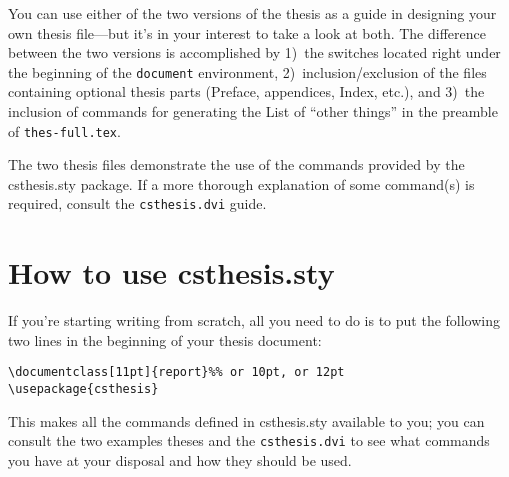 You can use either of the two versions of the thesis as a guide in
designing your own thesis file---but it's in your interest to take a
look at both. The difference between the two versions is accomplished
by 1)~the switches located right under the beginning of the
\verb+document+ environment, 2)~inclusion/exclusion of the files
containing optional thesis parts (Preface,
appendices, Index, etc.), and 3)~the inclusion of commands for
generating the List of ``other things'' in the preamble of
\texttt{thes-full.tex}.

The two thesis files demonstrate the use of the commands provided by
the \textsf{csthesis.sty}
package. If a more thorough explanation of some command(s) is
required, consult the
\texttt{csthesis.dvi} guide.

\section{How to use \textsf{csthesis.sty}}

If you're starting writing from scratch, all you
need to do is to put the following two lines in the beginning of your
thesis document:
\begin{verbatim}
\documentclass[11pt]{report}%% or 10pt, or 12pt
\usepackage{csthesis}
\end{verbatim}
This makes all the commands defined in \textsf{csthesis.sty}%
 available to you; you can
consult the two examples theses and the
\texttt{csthesis.dvi} to see
what commands you have at your disposal and
how they should be used.

